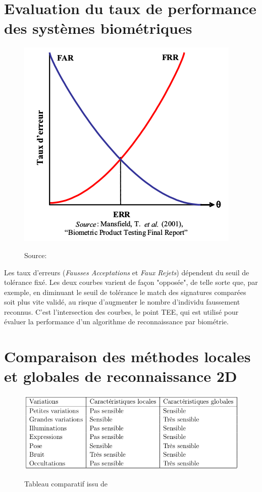 \documentclass{sig-alternate-05-2015}
\begin{document}
\section{Evaluation du taux de performance des systèmes biométriques}
\begin{figure}[h!]
\center\includegraphics[scale=.5]{images/biometrie-performance}\label{perfo-systeme}
\caption{Source: \cite{Xphdthesis_1}}
\end{figure}
Les taux d'erreurs (\textit{Fausses Acceptations} et \textit{Faux Rejets}) dépendent du seuil de tolérance fixé. Les deux courbes varient de façon "opposée", de telle sorte que, par exemple, en diminuant le seuil de tolérance le match des signatures comparées soit plus vite validé, au risque d'augmenter le nombre d'individu faussement reconnus.  C'est l'intersection des courbes, le point TEE, qui est utilisé pour évaluer la performance d'un algorithme de reconnaissance par biométrie.

\section{Comparaison des méthodes locales et globales de reconnaissance 2D}
\begin{figure}[h!]
\center\includegraphics[scale=.4]{images/locales-vs-globales}\label{locales-vs-globales}
\caption{Tableau comparatif issu de \cite{Xphdthesis_1}}
\end{figure}
\end{document}
